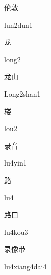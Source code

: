 \begin{verbete}{伦敦}
\begin{pronuncia}{lun2dun1}
\end{pronuncia}
\end{verbete}

\begin{verbete}[long2]{龙}
\begin{pronuncia}{long2}
\end{pronuncia}
\end{verbete}

\begin{verbete}{龙山}
\begin{pronuncia}{Long2shan1}
\end{pronuncia}
\end{verbete}

\begin{verbete}[lou2]{楼}
\begin{pronuncia}{lou2}
\end{pronuncia}
\end{verbete}

\begin{verbete}[lu4yin1]{录音}
\begin{pronuncia}{lu4yin1}
\end{pronuncia}
\end{verbete}

\begin{verbete}[lu4]{路}
\begin{pronuncia}{lu4}
\end{pronuncia}
\end{verbete}

\begin{verbete}[lu4kou3]{路口}
\begin{pronuncia}{lu4kou3}
\end{pronuncia}
\end{verbete}

\begin{verbete}{录像带}
\begin{pronuncia}{lu4xiang4dai4}
\end{pronuncia}
\end{verbete}

